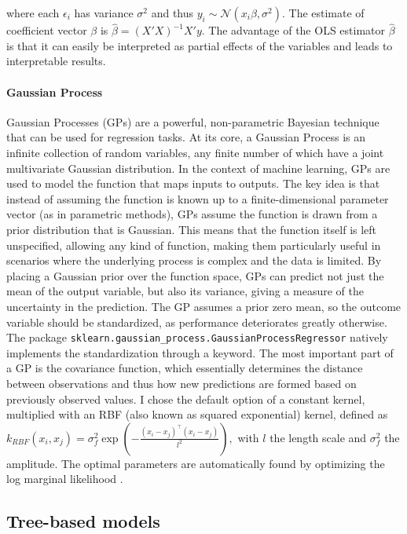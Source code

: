 \documentclass{article}
\begin{document}
where each $\epsilon_i$ has variance $\sigma^2$ and thus $y_i \sim \mathcal N(x_i\beta, \sigma^2)$. The estimate of coefficient vector $\beta$ is $\hat \beta = (X'X)^{-1}X'y$. The advantage of the OLS estimator $\hat \beta$ is that it can easily be interpreted as partial effects of the variables and leads to interpretable results.

\paragraph{Gaussian Process} 
Gaussian Processes (GPs) are a powerful, non-parametric Bayesian technique that can be used for regression tasks. At its core, a Gaussian Process is an infinite collection of random variables, any finite number of which have a joint multivariate Gaussian distribution. In the context of machine learning, GPs are used to model the function that maps inputs to outputs. The key idea is that instead of assuming the function is known up to a finite-dimensional parameter vector (as in parametric methods), GPs assume the function is drawn from a prior distribution that is Gaussian. This means that the function itself is left unspecified, allowing any kind of function, making them particularly useful in scenarios where the underlying process is complex and the data is limited. By placing a Gaussian prior over the function space, GPs can predict not just the mean of the output variable, but also its variance, giving a measure of the uncertainty in the prediction. The GP assumes a prior zero mean, so the outcome variable should be standardized, as performance deteriorates greatly otherwise. The package \texttt{sklearn.gaussian\_process.GaussianProcessRegressor} natively implements the standardization through a keyword. The most important part of a GP is the covariance function, which essentially determines the distance between observations and thus how new predictions are formed based on previously observed values. I chose the default option of a constant kernel, multiplied with an RBF (also known as squared exponential) kernel, defined as $k_{RBF}(x_i, x_j) = \sigma^2_f\exp\left(-\frac{(x_i - x_j)^\top(x_i - x_j)}{l^2}\right),$ with $l$ the length scale and $\sigma^2_f$ the amplitude. The optimal parameters are automatically found by optimizing the log marginal likelihood \citep{schulz2018tutorial}.

\subsection*{Tree-based models}
\end{document}
